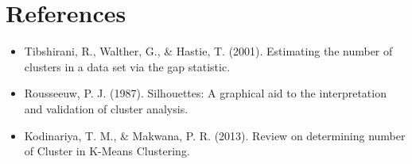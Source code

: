 \section*{References}

\begin{itemize}
\item Tibshirani, R., Walther, G., \& Hastie, T. (2001). Estimating the number of clusters in a data set via the gap statistic.
\item Rousseeuw, P. J. (1987). Silhouettes: A graphical aid to the interpretation and validation of cluster analysis.
\item Kodinariya, T. M., \& Makwana, P. R. (2013). Review on determining number of Cluster in K-Means Clustering.
\end{itemize}
